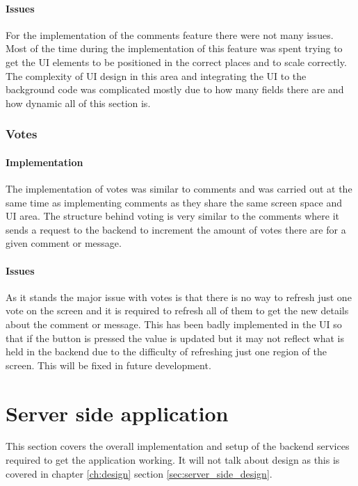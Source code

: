 \paragraph*{Issues}

For the implementation of the comments feature there were not many issues. Most of the time during the implementation of this feature was spent trying to get the UI elements to be positioned in the correct places and to scale correctly. The complexity of UI design in this area and integrating the UI to the background code was complicated mostly due to how many fields there are and how dynamic all of this section is.

\subsubsection*{Votes}

\paragraph*{Implementation}

The implementation of votes was similar to comments and was carried out at the same time as implementing comments as they share the same screen space and UI area. The structure behind voting is very similar to the comments where it sends a request to the backend to increment the amount of votes there are for a given comment or message.

\paragraph*{Issues}

As it stands the major issue with votes is that there is no way to refresh just one vote on the screen and it is required to refresh all of them to get the new details about the comment or message. This has been badly implemented in the UI so that if the button is pressed the value is updated but it may not reflect what is held in the backend due to the difficulty of refreshing just one region of the screen. This will be fixed in future development.

\section{Server side application}

This section covers the overall implementation and setup of the backend services required to get the application working. It will not talk about design as this is covered in chapter \ref{ch:design} section \ref{sec:server_side_design}.

